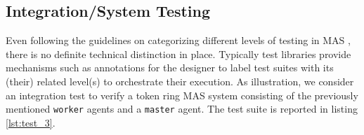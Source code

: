 \subsection{Integration/System Testing}



Even following the guidelines on categorizing different levels of testing in MAS \cite{Moreno2009}, there is no definite technical distinction in place. Typically test libraries provide mechanisms such as annotations for the designer to label test suites with its (their) related level(s) to orchestrate their execution. As illustration, we consider an integration test to verify a token ring MAS system consisting of the previously mentioned \texttt{worker} agents and a \texttt{master} agent. The test suite is reported in listing \ref{lst:test_3}.

